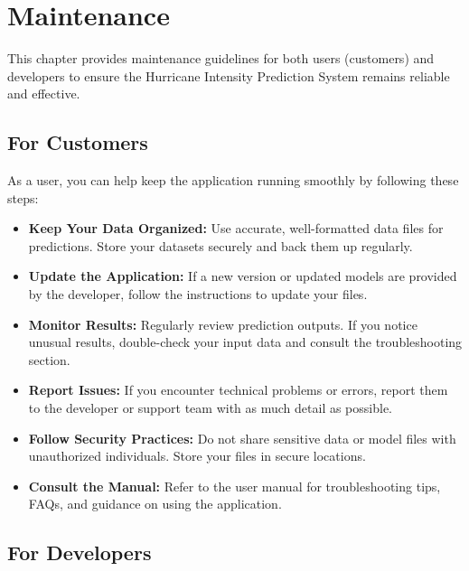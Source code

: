 %
%

\chapter{Maintenance}

This chapter provides maintenance guidelines for both users (customers) and developers to ensure the Hurricane Intensity Prediction System remains reliable and effective.

\section*{For Customers}

As a user, you can help keep the application running smoothly by following these steps:
\begin{itemize}
	\item \textbf{Keep Your Data Organized:} Use accurate, well-formatted data files for predictions. Store your datasets securely and back them up regularly.
	\item \textbf{Update the Application:} If a new version or updated models are provided by the developer, follow the instructions to update your files.
	\item \textbf{Monitor Results:} Regularly review prediction outputs. If you notice unusual results, double-check your input data and consult the troubleshooting section.
	\item \textbf{Report Issues:} If you encounter technical problems or errors, report them to the developer or support team with as much detail as possible.
	\item \textbf{Follow Security Practices:} Do not share sensitive data or model files with unauthorized individuals. Store your files in secure locations.
	\item \textbf{Consult the Manual:} Refer to the user manual for troubleshooting tips, FAQs, and guidance on using the application.
\end{itemize}

\section*{For Developers}

